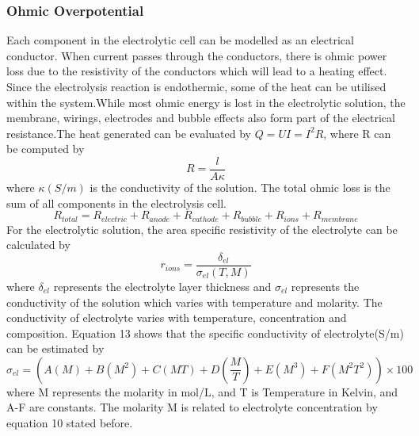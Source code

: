 \subsubsection{Ohmic Overpotential} 
Each component in the electrolytic cell can be modelled as an electrical conductor. When current passes through the conductors, there is ohmic power loss due to the resistivity of the conductors which will lead to a heating effect. Since the electrolysis reaction is endothermic, some of the heat can be utilised within the system.While most ohmic energy is lost in the electrolytic solution, the membrane, wirings, electrodes  and bubble effects also form part of the electrical resistance.The heat generated can be evaluated by  $ Q=UI=I^2 R$, where R can be computed by
 \begin{equation}
R=\frac{l} {A \kappa} 
\end{equation} 
where $ \kappa(S/m) $  is the conductivity of the solution.\newline
The total ohmic loss is the sum of all components in the electrolysis cell.
\begin{equation} 
R_{total}=R_{electric} + R_{anode}+ R_{cathode}+R_{bubble}+R_{ions} +R_{membrane} 
\end{equation} 
For the electrolytic solution, the area specific resistivity of the electrolyte can be calculated by
\begin{equation} 
r_{ions}=\frac{\delta_{el}} {\sigma_{el}(T,M) } 
\end{equation} 
where $\delta_{el}$ represents the electrolyte layer thickness and $\sigma_{el}$ represents the conductivity of the solution which varies with temperature and molarity.
The conductivity of electrolyte varies with temperature, concentration and composition. Equation 13 shows that the specific conductivity of  electrolyte(S/m) can be estimated by
\begin{equation} 
\sigma_{el} = (A(M) + B(M^2) + C(MT) + D(\frac{M} {T}) + E(M^3) +F(M^2T^2) )\times 100
\end{equation} 
where M represents the molarity in mol/L, and T is Temperature in Kelvin, and A-F are constants.\cite{conductivity}  The molarity M is related to electrolyte concentration by equation 10 stated before. 
